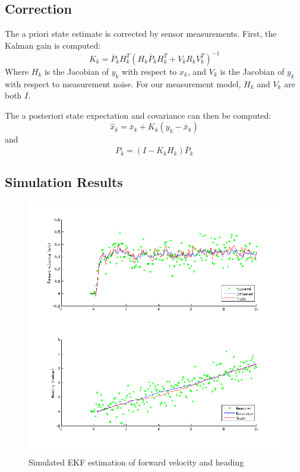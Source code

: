 \documentclass[11pt]{article} %
\begin{document}
\subsection{Correction}

The a priori state estimate is corrected by sensor measurements.  First, the Kalman gain is computed:
\begin{equation}
K_k = \bar{P}_k H_k^T ( H_k \bar{P}_k H_k^T + V_k R_k V_k^T ) ^{-1}
\end{equation}
Where $H_k$ is the Jacobian of $y_k$ with respect to $x_k$, and $V_k$ is the Jacobian of $y_k$ with respect to measurement noise.   For our measurement model, $H_k$ and $V_k$ are both $I$.

The a posteriori state expectation and covariance can then be computed:
\begin{equation}
\hat{x}_k = \bar{x}_k + K_k (y_k - \bar{x}_k)
\end{equation}
and
\begin{equation}
P_k = (I - K_k H_k) \bar{P}_k
\end{equation}

\clearpage
\subsection{Simulation Results}

\begin{figure}[hbt]
 \centering
 \includegraphics[scale=0.60]{ekf_sim_vh.png}
 \caption{Simulated EKF estimation of forward velocity and heading}
 \label{ekf_s_vh}
\end{figure}
\end{document}
